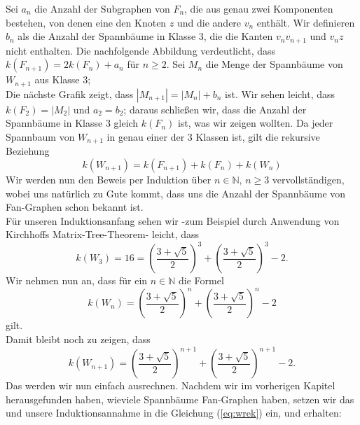 Sei $a_n$ die Anzahl der Subgraphen von $F_n$, die aus genau zwei Komponenten bestehen, von denen eine den Knoten $z$ und die andere $v_n$ enthält.
Wir definieren $b_n$ als die Anzahl der Spannbäume in Klasse 3, die die Kanten $v_nv_{n+1}$ und $v_nz$ nicht enthalten. 
Die nachfolgende Abbildung verdeutlicht, dass $\mathit{k}(F_{n+1})=2\mathit{k}(F_{n})+a_n$ für $n\geq 2$.
Sei $M_n$ die Menge der Spannbäume von $W_{n+1}$ aus Klasse 3;\\
Die nächste Grafik zeigt, dass $|M_{n+1}|=|M_n|+b_n$ ist.
Wir sehen leicht, dass $\mathit{k}(F_2) = |M_2|$ und $a_2=b_2$; daraus schließen wir, dass die Anzahl der Spannbäume in Klasse 3 gleich $\mathit{k}(F_{n})$ ist, was wir zeigen wollten.
Da jeder Spannbaum von $W_{n+1}$ in genau einer der 3 Klassen ist, gilt die rekursive Beziehung
\begin{equation}
\mathit{k}(W_{n+1}) = \mathit{k}(F_{n+1}) + \mathit{k}(F_n) + \mathit{k}(W_n)
\label{eq:wrek}
\end{equation}
Wir werden nun den Beweis per Induktion über $n \in \mathbb{N}, \, n \geq 3$ vervollständigen, wobei uns natürlich zu Gute kommt, dass uns die Anzahl der Spannbäume von Fan-Graphen schon bekannt ist.\\
Für unseren Induktionsanfang sehen wir -zum Beispiel durch Anwendung von Kirchhoffs Matrix-Tree-Theorem- leicht, dass \begin{equation}
\mathit{k}(W_3) = 16 = (\frac{3+\sqrt{5}}{2})^3+(\frac{3+\sqrt{5}}{2})^3-2.
\end{equation}
Wir nehmen nun an, dass für ein $n \in \mathbb{N}$ die Formel 
\begin{equation}
 \mathit{k}(W_n) = (\frac{3+\sqrt{5}}{2})^n+(\frac{3+\sqrt{5}}{2})^n-2
\end{equation}
gilt.\\
Damit bleibt noch zu zeigen, dass
\begin{equation}
 \mathit{k}(W_{n+1}) = (\frac{3+\sqrt{5}}{2})^{n+1}+(\frac{3+\sqrt{5}}{2})^{n+1}-2.
\end{equation}
Das werden wir nun einfach ausrechnen.
Nachdem wir im vorherigen Kapitel herausgefunden haben, wieviele Spannbäume Fan-Graphen haben, setzen wir das und unsere Induktionsannahme in die Gleichung (\ref{eq:wrek}) ein, und erhalten:\\
